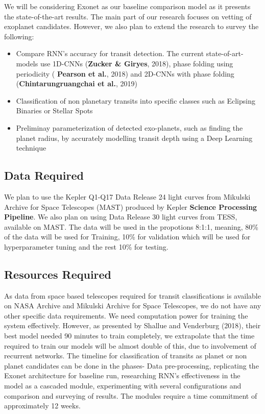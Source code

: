 We will be considering Exonet as our baseline comparison model as it presents the state-of-the-art results. The main part of our research focuses on vetting of exoplanet candidates. However, we also plan to extend the research to survey the following:
\begin{itemize}
    \item Compare RNN's accuracy for transit detection. The current state-of-art-models use 1D-CNNs (\textbf{Zucker & Giryes}, 2018), phase folding using periodicity ( \textbf{Pearson et al.}, 2018) and 2D-CNNs with phase folding (\textbf{Chintarungruangchai et al.}, 2019)
    \item Classification of non planetary transits into specific classes such as Eclipsing Binaries or Stellar Spots
    \item Preliminay parameterization of detected exo-planets, such as finding the planet radius, by accurately modelling transit depth using a Deep Learning technique
\end{itemize}

\subsection{Data Required}
We plan to use the Kepler Q1-Q17 Data Release 24 light curves from Mikulski Archive for Space Telescopes (MAST) produced by Kepler \textbf{Science Processing Pipeline}. We also plan on using Data Release 30 light curves from TESS, available on MAST. The data will be used in the propotions 8:1:1, meaning, 80\% of the data will be used for Training, 10\% for validation which will be used for hyperparameter tuning and the rest 10\% for testing. 
\subsection{Resources Required}
As data from space based telescopes required for transit classifications is available on NASA Archive and Mikulski Archive for Space Telescopes, we do not have any other specific data requirements. We need computation power for training the system effectively. However, as presented by Shallue and Venderburg (2018), their best model needed 90 minutes to train completely, we extrapolate that the time required to train our models will be almost double of this, due to involvement of recurrent networks. The timeline for classification of transits as planet or non planet candidates can be done in the phases- Data pre-processing, replicating the Exonet architecture for baseline run, researching RNN's effectiveness in the model as a cascaded module, experimenting with several configurations and comparison and surveying of results. The modules require a time commitment of approximately 12 weeks.
